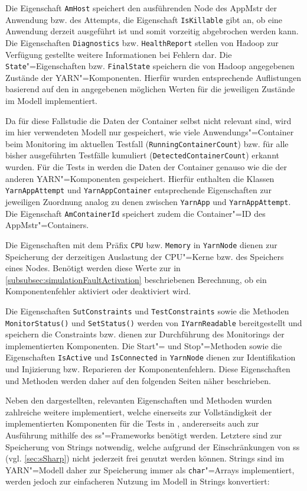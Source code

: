 Die Eigenschaft \texttt{AmHost} speichert den ausführenden Node des \ac{AppMstr} der Anwendung bzw. des Attempts, die Eigenschaft \texttt{IsKillable} gibt an, ob eine Anwendung derzeit ausgeführt ist und somit vorzeitig abgebrochen werden kann.
Die Eigenschaften \texttt{Diagnostics} bzw. \texttt{HealthReport} stellen von Hadoop zur Verfügung gestellte weitere Informationen bei Fehlern dar.
Die \texttt{State}"=Eigenschaften bzw. \texttt{FinalState} speichern die von Hadoop angegebenen Zustände der \ac{YARN}"=Komponenten.
Hierfür wurden entsprechende Auflistungen basierend auf den in \cite{HadoopRmApi271} angegebenen möglichen Werten für die jeweiligen Zustände im Modell implementiert.

Da für diese Fallstudie die Daten der Container selbst nicht relevant sind, wird im hier verwendeten Modell nur gespeichert, wie viele Anwendungs"=Container beim Monitoring im aktuellen Testfall (\texttt{RunningContainerCount}) bzw. für alle bisher ausgeführten Testfälle kumuliert (\texttt{DetectedContainerCount}) erkannt wurden.
Für die Tests in \cite{Eberhardinger2018} werden die Daten der Container genauso wie die der anderen \ac{YARN}"=Komponenten gespeichert.
Hierfür enthalten die Klassen \texttt{YarnAppAttempt} und \texttt{YarnAppContainer} entsprechende Eigenschaften zur jeweiligen Zuordnung analog zu denen zwischen \texttt{YarnApp} und \texttt{YarnAppAttempt}.
Die Eigenschaft \texttt{AmContainerId} speichert zudem die Container"=ID des \ac{AppMstr}"=Containers.

Die Eigenschaften mit dem Präfix \texttt{CPU} bzw. \texttt{Memory} in \texttt{YarnNode} dienen zur Speicherung der derzeitigen Auslastung der CPU"=Kerne bzw. des Speichers eines Nodes.
Benötigt werden diese Werte zur in \cref{subsubsec:simulationFaultActivation} beschriebenen Berechnung, ob ein Komponentenfehler aktiviert oder deaktiviert wird.

Die Eigenschaften \texttt{SutConstraints} und \texttt{TestConstraints} sowie die Methoden \texttt{MonitorStatus()} und \texttt{SetStatus()} werden von \texttt{IYarnReadable} bereitgestellt und speichern die Constraints bzw. dienen zur Durchführung des Monitorings der implementierten Komponenten.
Die Start"= und Stop"=Methoden sowie die Eigenschaften \texttt{IsActive} und \texttt{IsConnected} in \texttt{YarnNode} dienen zur Identifikation und Injizierung bzw. Reparieren der Komponentenfehlern.
Diese Eigenschaften und Methoden werden daher auf den folgenden Seiten näher beschrieben.

Neben den dargestellten, relevanten Eigenschaften und Methoden wurden zahlreiche weitere implementiert, welche einerseits zur Vollständigkeit der implementierten Komponenten für die Tests in \cite{Eberhardinger2018}, andererseits auch zur Ausführung mithilfe des \ac{ss}"=Frameworks benötigt werden.
Letztere sind \zB zur Speicherung von Strings notwendig, welche aufgrund der Einschränkungen von \ac{ss} (vgl. \cref{sec:sSharp}) nicht jederzeit frei genutzt werden können.
Strings sind im \ac{YARN}"=Modell daher zur Speicherung immer als  \texttt{char}"=Arrays implementiert, werden jedoch zur einfacheren Nutzung im Modell in Strings konvertiert:

